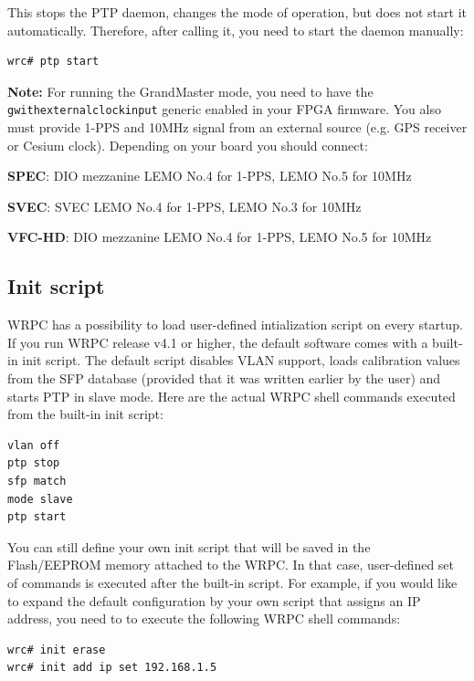 \documentclass[a4paper, 12pt]{article}
\renewcommand{\_}{\underscore\allowbreak}
\begin{document}
This stops the PTP daemon, changes the mode of operation, but does not start it
automatically. Therefore, after calling it, you need to start the daemon
manually:

\begin{lstlisting}
wrc# ptp start
\end{lstlisting}

\noindent\textbf{Note:} For running the GrandMaster mode, you need to have the
\texttt{g\_with\_external\_clock\_input} generic enabled in your FPGA firmware.
You also must provide 1-PPS and 10MHz signal from an external source (e.g. GPS receiver or
Cesium clock). Depending on your board you should connect:
\begin{itemize*}
  \item \textbf{SPEC}: DIO mezzanine LEMO No.4 for 1-PPS, LEMO No.5 for 10MHz
  \item \textbf{SVEC}: SVEC LEMO No.4 for 1-PPS, LEMO No.3 for 10MHz
  \item \textbf{VFC-HD}: DIO mezzanine LEMO No.4 for 1-PPS, LEMO No.5 for 10MHz
\end{itemize*}

\subsection{Init script}
\label{Init script}
WRPC has a possibility to load user-defined intialization script on every
startup. If you run WRPC release v4.1 or higher, the default software
comes with a built-in init script. The default script disables VLAN support,
loads calibration values from the SFP database (provided that it was written
earlier by the user) and starts PTP in slave mode. Here are the actual WRPC
shell commands executed from the built-in init script:
\begin{lstlisting}
vlan off
ptp stop
sfp match
mode slave
ptp start
\end{lstlisting}

You can still define your own init script that will be saved in the
Flash/EEPROM memory attached to the WRPC. In that case, user-defined set of
commands is executed after the built-in script. For example, if you would
like to expand the default configuration by your own script that assigns an IP
address, you need to to execute the following WRPC shell commands:
\begin{lstlisting}
wrc# init erase
wrc# init add ip set 192.168.1.5
\end{lstlisting}
\end{document}
